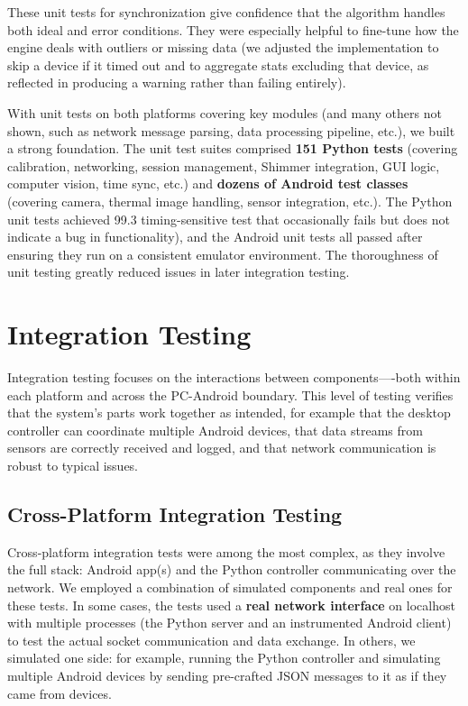 These unit tests for synchronization give confidence that the algorithm
handles both ideal and error conditions. They were especially helpful to
fine-tune how the engine deals with outliers or missing data (we
adjusted the implementation to skip a device if it timed out and to
aggregate stats excluding that device, as reflected in producing a
warning rather than failing entirely).

With unit tests on both platforms covering key modules (and many others
not shown, such as network message parsing, data processing pipeline,
etc.), we built a strong foundation. The unit test suites comprised
\textbf{151 Python tests} (covering calibration, networking, session
management, Shimmer integration, GUI logic, computer vision, time sync,
etc.) and \textbf{dozens of Android test classes} (covering camera, thermal
image handling, sensor integration, etc.). The Python unit tests
achieved 99.3%
timing-sensitive test that occasionally fails but does not indicate a
bug in functionality), and the Android unit tests all passed after
ensuring they run on a consistent emulator environment. The thoroughness
of unit testing greatly reduced issues in later integration testing.

\section{Integration Testing}

Integration testing focuses on the interactions between
components----both within each platform and across the PC-Android
boundary. This level of testing verifies that the system's parts work
together as intended, for example that the desktop controller can
coordinate multiple Android devices, that data streams from sensors are
correctly received and logged, and that network communication is robust
to typical issues.

\subsection{Cross-Platform Integration Testing}

Cross-platform integration tests were among the most complex, as they
involve the full stack: Android app(s) and the Python controller
communicating over the network. We employed a combination of simulated
components and real ones for these tests. In some cases, the tests used
a \textbf{real network interface} on localhost with multiple processes (the
Python server and an instrumented Android client) to test the actual
socket communication and data exchange. In others, we simulated one
side: for example, running the Python controller and simulating multiple
Android devices by sending pre-crafted JSON messages to it as if they
came from devices.

